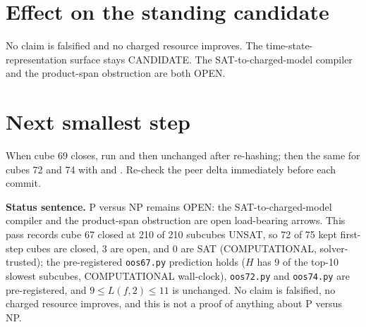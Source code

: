 \documentclass[11pt]{article}
\begin{document}
\section*{Effect on the standing candidate}
No claim is falsified and no charged resource improves. The time-state-representation surface stays CANDIDATE. The SAT-to-charged-model compiler and the product-span obstruction are both OPEN.

\section*{Next smallest step}
When cube 69 closes, run  and then  unchanged after re-hashing; then the same for cubes 72 and 74 with  and . Re-check the peer delta immediately before each commit.

\bigskip
\noindent\textbf{Status sentence.} P versus NP remains OPEN: the SAT-to-charged-model compiler and the product-span obstruction are open load-bearing arrows. This pass records cube 67 closed at 210 of 210 subcubes UNSAT, so 72 of 75 kept first-step cubes are closed, 3 are open, and 0 are SAT (COMPUTATIONAL, solver-trusted); the pre-registered \texttt{oos67.py} prediction holds ($H$ has 9 of the top-10 slowest subcubes, COMPUTATIONAL wall-clock), \texttt{oos72.py} and \texttt{oos74.py} are pre-registered, and $9\le L(f,2)\le 11$ is unchanged. No claim is falsified, no charged resource improves, and this is not a proof of anything about P versus NP.
\end{document}
